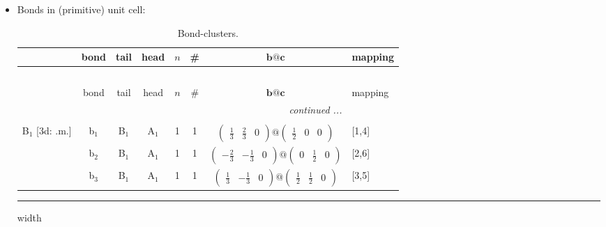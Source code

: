 \documentclass[fleqn,10pt,landscape]{article}
\begin{document}
\begin{itemize}
\item Bonds in (primitive) unit cell:
\begin{center}
\renewcommand{\arraystretch}{1.3}
\begin{longtable}{cc|cc|c|c|c|l}
\caption{Bond-clusters.}
 \\
 \hline \hline
 & bond & tail & head & $n$ & \# & $\bm{b}@\bm{c}$ & mapping \\ \hline \endfirsthead

\multicolumn{7}{l}{\tablename\ \thetable{}} \\
 \hline \hline
 & bond & tail & head & $n$ & \# & $\bm{b}@\bm{c}$ & mapping \\ \hline \endhead

 \hline \hline
\multicolumn{7}{r}{\footnotesize\it continued ...} \\ \endfoot

 \hline \hline
\multicolumn{7}{r}{} \\ \endlastfoot

B$_{1}$ [3d: .m.] & b$_{1}$ & B$_{1}$ & A$_{1}$ & 1 & 1 & $\begin{pmatrix} \frac{1}{3} & \frac{2}{3} & 0 \end{pmatrix}@\begin{pmatrix} \frac{1}{2} & 0 & 0 \end{pmatrix}$ & [1,4] \\
& b$_{2}$ & B$_{1}$ & A$_{1}$ & 1 & 1 & $\begin{pmatrix} - \frac{2}{3} & - \frac{1}{3} & 0 \end{pmatrix}@\begin{pmatrix} 0 & \frac{1}{2} & 0 \end{pmatrix}$ & [2,6] \\
& b$_{3}$ & B$_{1}$ & A$_{1}$ & 1 & 1 & $\begin{pmatrix} \frac{1}{3} & - \frac{1}{3} & 0 \end{pmatrix}@\begin{pmatrix} \frac{1}{2} & \frac{1}{2} & 0 \end{pmatrix}$ & [3,5] \\
\end{longtable}
\end{center}

 \hfil \hrule height 1mm width \textwidth \hfil


\end{itemize}
\end{document}
